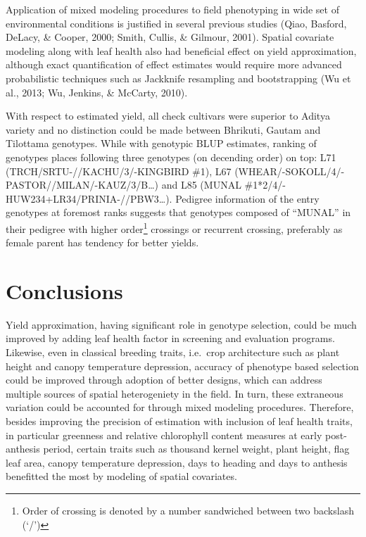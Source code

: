 \documentclass[12pt,oneside]{dukestatscithesis} %
\begin{document}
Application of mixed modeling procedures to field phenotyping in wide set of environmental conditions is justified in several previous studies (Qiao, Basford, DeLacy, \& Cooper, 2000; Smith, Cullis, \& Gilmour, 2001). Spatial covariate modeling along with leaf health also had beneficial effect on yield approximation, although exact quantification of effect estimates would require more advanced probabilistic techniques such as Jackknife resampling and bootstrapping (Wu et al., 2013; Wu, Jenkins, \& McCarty, 2010).

With respect to estimated yield, all check cultivars were superior to Aditya variety and no distinction could be made between Bhrikuti, Gautam and Tilottama genotypes. While with genotypic BLUP estimates, ranking of genotypes places following three genotypes (on decending order) on top: L71 (TRCH/SRTU-//KACHU/3/-KINGBIRD \#1), L67 (WHEAR/-SOKOLL/4/-PASTOR//MILAN/-KAUZ/3/B\ldots) and L85 (MUNAL \#1*2/4/-HUW234+LR34/PRINIA-//PBW3\ldots). Pedigree information of the entry genotypes at foremost ranks suggests that genotypes composed of ``MUNAL'' in their pedigree with higher order\footnote{Order of crossing is denoted by a number sandwiched between two backslash (`/')} crossings or recurrent crossing, preferably as female parent has tendency for better yields.

\hypertarget{conclusions}{%
\chapter*{Conclusions}\label{conclusions}}

Yield approximation, having significant role in genotype selection, could be much improved by adding leaf health factor in screening and evaluation programs. Likewise, even in classical breeding traits, i.e.~crop architecture such as plant height and canopy temperature depression, accuracy of phenotype based selection could be improved through adoption of better designs, which can address multiple sources of spatial heterogeniety in the field. In turn, these extraneous variation could be accounted for through mixed modeling procedures. Therefore, besides improving the precision of estimation with inclusion of leaf health traits, in particular greenness and relative chlorophyll content measures at early post-anthesis period, certain traits such as thousand kernel weight, plant height, flag leaf area, canopy temperature depression, days to heading and days to anthesis benefitted the most by modeling of spatial covariates.
\end{document}

